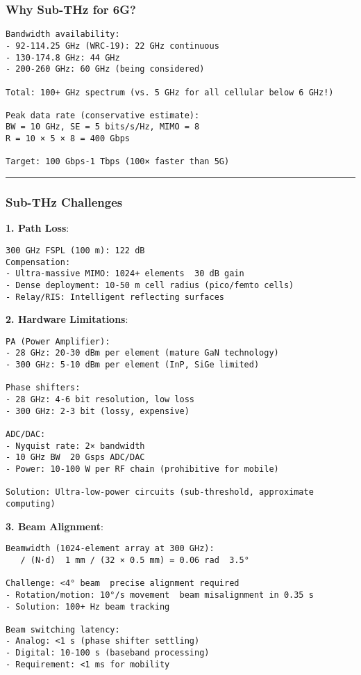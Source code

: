 \subsubsection{Why Sub-THz for 6G?}\label{why-sub-thz-for-6g}

\begin{verbatim}
Bandwidth availability:
- 92-114.25 GHz (WRC-19): 22 GHz continuous
- 130-174.8 GHz: 44 GHz
- 200-260 GHz: 60 GHz (being considered)

Total: 100+ GHz spectrum (vs. 5 GHz for all cellular below 6 GHz!)

Peak data rate (conservative estimate):
BW = 10 GHz, SE = 5 bits/s/Hz, MIMO = 8
R = 10 × 5 × 8 = 400 Gbps

Target: 100 Gbps-1 Tbps (100× faster than 5G)
\end{verbatim}

\begin{center}\rule{0.5\linewidth}{0.5pt}\end{center}

\subsubsection{Sub-THz Challenges}\label{sub-thz-challenges}

\textbf{1. Path Loss}:

\begin{verbatim}
300 GHz FSPL (100 m): 122 dB
Compensation:
- Ultra-massive MIMO: 1024+ elements  30 dB gain
- Dense deployment: 10-50 m cell radius (pico/femto cells)
- Relay/RIS: Intelligent reflecting surfaces
\end{verbatim}

\textbf{2. Hardware Limitations}:

\begin{verbatim}
PA (Power Amplifier):
- 28 GHz: 20-30 dBm per element (mature GaN technology)
- 300 GHz: 5-10 dBm per element (InP, SiGe limited)

Phase shifters:
- 28 GHz: 4-6 bit resolution, low loss
- 300 GHz: 2-3 bit (lossy, expensive)

ADC/DAC:
- Nyquist rate: 2× bandwidth
- 10 GHz BW  20 Gsps ADC/DAC
- Power: 10-100 W per RF chain (prohibitive for mobile)

Solution: Ultra-low-power circuits (sub-threshold, approximate computing)
\end{verbatim}

\textbf{3. Beam Alignment}:

\begin{verbatim}
Beamwidth (1024-element array at 300 GHz):
   / (N·d)  1 mm / (32 × 0.5 mm) = 0.06 rad  3.5°

Challenge: <4° beam  precise alignment required
- Rotation/motion: 10°/s movement  beam misalignment in 0.35 s
- Solution: 100+ Hz beam tracking

Beam switching latency:
- Analog: <1 s (phase shifter settling)
- Digital: 10-100 s (baseband processing)
- Requirement: <1 ms for mobility
\end{verbatim}

